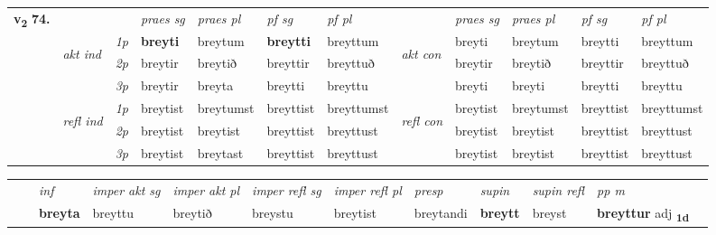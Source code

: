 \begin{tabular}{llllllllllll} \toprule
\multirow{4}{*}{{{\textbf{v{\textsubscript{2}}} \Large{\textbf{74.}}}}}  & &   &  \textit{praes sg}  & \textit{praes pl}  &\textit{ pf sg} & \textit{pf pl} &  &  \textit{praes sg}  & \textit{praes pl}  & \textit{pf sg} & \textit{pf pl } \\*
	\cmidrule{4-7} \cmidrule{9-12}
 & \multirow{3}{*}{\begin{turn}{90}\textit{akt ind}\end{turn}} & {\textit{1p}} & \textbf{breyti} & breytum    & \textbf{breytti} & breyttum & \multirow{3}{*}{\begin{turn}{90}\textit{akt con}\end{turn}} &breyti & breytum & breytti & breyttum\\*
& &  {\textit{2p}} &  breytir  & breytið   & breyttir & breyttuð & & breytir & breytið & breyttir & breyttuð \\*
& &  {\textit{3p}} & breytir & breyta   & breytti & breyttu & & breyti & breyti& breytti & breyttu  \\*
\cmidrule{4-7} \cmidrule{9-12}
 &\multirow{3}{*}{\begin{turn}{90}\textit{refl ind}\end{turn}} & {\textit{1p}} & breytist & breytumst    & breyttist & breyttumst & \multirow{3}{*}{\begin{turn}{90}\textit{refl con}\end{turn}}  &breytist & breytumst & breyttist & breyttumst\\*
 &&  {\textit{2p}} &  breytist  & breytist   & breyttist & breyttust & &breytist & breytist & breyttist & breyttust \\*
& &  {\textit{3p}} & breytist & breytast   & breyttist & breyttust & & breytist & breytist& breyttist & breyttust  \\*
\cmidrule{4-7} \cmidrule{9-12}
\end{tabular}


\begin{tabular}{llllllllllll}
 & & \textit{inf} & \textit{imper akt sg} & \textit{imper akt pl} & \textit{imper refl sg} & \textit{imper refl pl} & \textit{presp} & \textit{supin} & \textit{supin refl} & \textit{pp m}     \\*
  & & \textbf{breyta} & breyttu  & breytið & breystu & breytist & breytandi &  \textbf{breytt} & breyst & \textbf{breyttur} adj \textbf{\textsubscript{1d}} \\*
\cmidrule{1-12}
\end{tabular}




